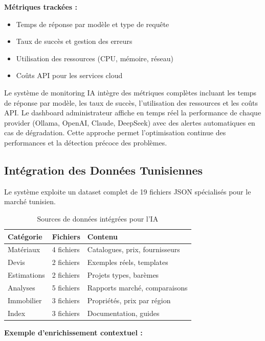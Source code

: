 \textbf{Métriques trackées :}
\begin{itemize}
    \item Temps de réponse par modèle et type de requête
    \item Taux de succès et gestion des erreurs
    \item Utilisation des ressources (CPU, mémoire, réseau)
    \item Coûts API pour les services cloud
\end{itemize}

Le système de monitoring IA intègre des métriques complètes incluant les temps de réponse par modèle, les taux de succès, l'utilisation des ressources et les coûts API. Le dashboard administrateur affiche en temps réel la performance de chaque provider (Ollama, OpenAI, Claude, DeepSeek) avec des alertes automatiques en cas de dégradation. Cette approche permet l'optimisation continue des performances et la détection précoce des problèmes.

\subsection{Intégration des Données Tunisiennes}

Le système exploite un dataset complet de 19 fichiers JSON spécialisés pour le marché tunisien.

\begin{table}[H]
\centering
\caption{Sources de données intégrées pour l'IA}
\label{tab:sources_donnees_ia}
\begin{tabular}{|p{3cm}|p{2cm}|p{6cm}|}
\hline
\textbf{Catégorie} & \textbf{Fichiers} & \textbf{Contenu} \\
\hline
Matériaux & 4 fichiers & Catalogues, prix, fournisseurs \\
\hline
Devis & 2 fichiers & Exemples réels, templates \\
\hline
Estimations & 2 fichiers & Projets types, barèmes \\
\hline
Analyses & 5 fichiers & Rapports marché, comparaisons \\
\hline
Immobilier & 3 fichiers & Propriétés, prix par région \\
\hline
Index & 3 fichiers & Documentation, guides \\
\hline
\end{tabular}
\end{table}

\textbf{Exemple d'enrichissement contextuel :}

